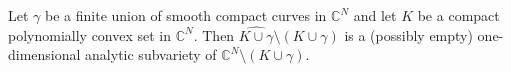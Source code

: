 
Let $\gamma$ be a finite union of smooth compact curves in $\mathbb{C}^N$ and let $K$ be a compact polynomially convex set in $\mathbb{C}^N$. Then $\widehat{K \cup \gamma} \setminus (K \cup \gamma)$ is a (possibly empty) one-dimensional analytic subvariety of $\mathbb{C}^N \setminus (K \cup \gamma)$.
